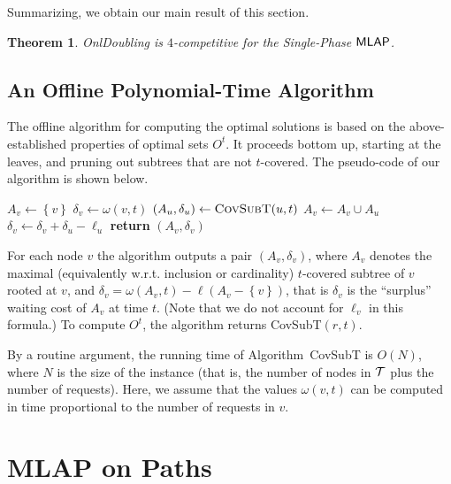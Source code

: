 \documentclass[a4paper]{article}
\newtheorem{theorem}{Theorem}[section]
\newcommand{\calT}{{\cal T}}
\newcommand{\braced}[1]{{ \left\{ #1 \right\} }}
\newcommand{\length}{\ell}
\newcommand{\surplus}{{\delta}}
\newcommand{\algDoubling}{\mbox{\sc OnlDoubling}}
\newcommand{\algCovSubT}{\mbox{\sc CovSubT}}
\newcommand{\MLAP}{\mbox{\rm\textsf{MLAP}}}
\begin{document}
Summarizing, we obtain our main result of this section.

\begin{theorem}\label{thm:doubling-for-phase}
	{\algDoubling} is $4$-competitive for the Single-Phase $\MLAP$.
\end{theorem}




\subsection{An Offline Polynomial-Time Algorithm}
\label{sec: 1p-mlap with deadlines}

The offline algorithm for computing the optimal solutions is based on
the above-established properties of optimal sets $O^t$.
It proceeds bottom up,
starting at the leaves, and pruning out subtrees that are not
$t$-covered.  The pseudo-code of our algorithm is shown below.


\begin{algorithm}[ht]
\caption{{\algCovSubT$(v,t)$}}\label{alg:paidsubtree}
\begin{algorithmic}[0]
\State $A_v \gets \braced{v}$
\State $\surplus_v \gets \omega(v,t)$
    \State $\left(A_u,\surplus_u\right) \gets \algCovSubT(u,t)$
	\If{$\surplus_u\ge \length_u$}
    	\State $A_v \gets A_v \cup A_u$
    	\State $\surplus_v \gets \surplus_v + \surplus_u - \length_u$
	\EndIf
\EndFor
\State \textbf{return} $\left(A_v,\surplus_v\right)$
\end{algorithmic}
\end{algorithm}


For each node $v$ the algorithm outputs a pair
$(A_v,\surplus_v)$, where $A_v$ denotes the maximal (equivalently w.r.t. inclusion or cardinality)
$t$-covered subtree of $v$ rooted at $v$, and 
$\surplus_v = \omega(A_v,t) - \length(A_v-\braced{v})$, that
is $\surplus_v$ is the ``surplus'' waiting cost of $A_v$ at time $t$. (Note that
we do not account for $\length_v$ in this formula.)
To compute $O^t$, the algorithm returns {\algCovSubT$(r,t)$}.

By a routine argument, the running time of Algorithm~{\algCovSubT} is
$O(N)$, where $N$ is the size of the instance (that is, the number of nodes
in $\calT$ plus the number of requests). Here, we assume that the
values $\omega(v,t)$ can be computed in time proportional to the number of
requests in $v$.




\section{{\MLAP} on Paths}
\label{sec: mlap on paths}
\end{document}
